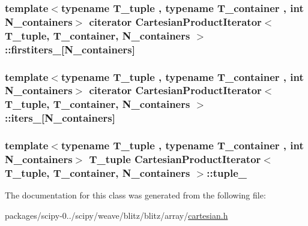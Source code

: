 \subsubsection[{firstiters\+\_\+}]{\setlength{\rightskip}{0pt plus 5cm}template$<$typename T\+\_\+tuple , typename T\+\_\+container , int N\+\_\+containers$>$ {\bf citerator} {\bf Cartesian\+Product\+Iterator}$<$ T\+\_\+tuple, T\+\_\+container, N\+\_\+containers $>$\+::firstiters\+\_\+\mbox{[}N\+\_\+containers\mbox{]}\hspace{0.3cm}{\ttfamily [protected]}}\label{classCartesianProductIterator_acda528d9fbc0beebfb5dd277937e03bb}
\hypertarget{classCartesianProductIterator_a1e544072a919e0e47fd9d243882586f3}{}
\subsubsection[{iters\+\_\+}]{\setlength{\rightskip}{0pt plus 5cm}template$<$typename T\+\_\+tuple , typename T\+\_\+container , int N\+\_\+containers$>$ {\bf citerator} {\bf Cartesian\+Product\+Iterator}$<$ T\+\_\+tuple, T\+\_\+container, N\+\_\+containers $>$\+::iters\+\_\+\mbox{[}N\+\_\+containers\mbox{]}\hspace{0.3cm}{\ttfamily [protected]}}\label{classCartesianProductIterator_a1e544072a919e0e47fd9d243882586f3}
\hypertarget{classCartesianProductIterator_a7e30094bf632ae9191ed3050bee6281f}{}
\subsubsection[{tuple\+\_\+}]{\setlength{\rightskip}{0pt plus 5cm}template$<$typename T\+\_\+tuple , typename T\+\_\+container , int N\+\_\+containers$>$ T\+\_\+tuple {\bf Cartesian\+Product\+Iterator}$<$ T\+\_\+tuple, T\+\_\+container, N\+\_\+containers $>$\+::tuple\+\_\+\hspace{0.3cm}{\ttfamily [protected]}}\label{classCartesianProductIterator_a7e30094bf632ae9191ed3050bee6281f}


The documentation for this class was generated from the following file\+:\begin{DoxyCompactItemize}
\item 
packages/scipy-\/0../scipy/weave/blitz/blitz/array/\hyperlink{cartesian_8h}{cartesian.\+h}\end{DoxyCompactItemize}
